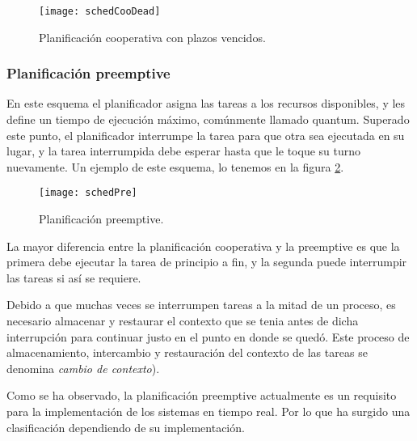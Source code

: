   \begin{figure}[ht]
      \centering
        \texttt{[image: schedCooDead]}
        \caption{Planificación \gls{cooperativa} con plazos vencidos.\cite{medium}}
        \label{fig:schedcoodead}
    \end{figure}
    
\subsubsection{Planificación preemptive}

En este esquema el planificador asigna las tareas a los recursos disponibles, y les define un tiempo de ejecución máximo, comúnmente llamado \gls{quantum}\cite{PreeK}. Superado este punto, el planificador interrumpe la tarea para que otra sea ejecutada en su lugar, y la tarea interrumpida debe esperar hasta que le toque su turno nuevamente. Un ejemplo de este esquema, lo tenemos en la figura \ref{fig:schedpree}.

  \begin{figure}[ht]
      \centering
        \texttt{[image: schedPre]}
        \caption{Planificación \gls{preemptive}.\cite{medium}}
        \label{fig:schedpree}
    \end{figure}

La mayor diferencia entre la planificación \gls{cooperativa} y la \gls{preemptive} es que la primera debe ejecutar la tarea de principio a fin, y la segunda puede interrumpir las tareas si así se requiere.

\vspace{0.3cm}
Debido a que muchas veces se interrumpen tareas a la mitad de un proceso, es necesario almacenar y restaurar el \gls{contexto} que se tenia antes de dicha interrupción para continuar justo en el punto en donde se quedó. Este proceso de almacenamiento, intercambio y restauración del \gls{contexto} de las tareas se denomina \textit{cambio de \gls{contexto}}).

\vspace{0.3cm}
Como se ha observado, la planificación \gls{preemptive} actualmente es un requisito para la implementación de los sistemas en tiempo real. Por lo que ha surgido una clasificación dependiendo de su implementación\cite{Buttazzo2013}.


